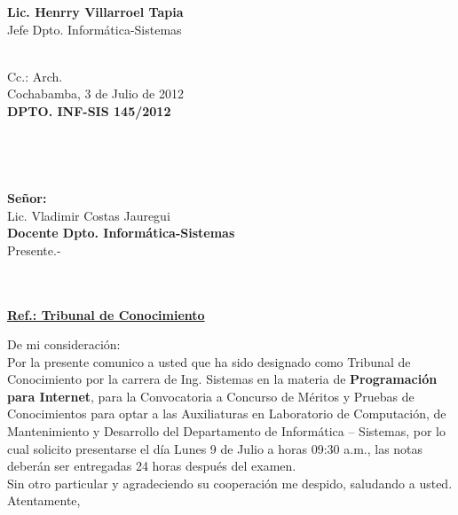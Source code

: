 \documentclass[letterpaper,11pt]{letter}
\begin{document}
\vspace{3.5cm}
\begin{center}
\begin{minipage}[b]{0.5\textwidth}
\begin{center}
{\bf Lic. Henrry Villarroel Tapia}\\
Jefe Dpto. Informática-Sistemas\\
\end{center}
\end{minipage}
\end{center}
~\\
Cc.: Arch.\\
\newpage
Cochabamba, 3 de Julio de 2012~\\
 \textbf{DPTO. INF-SIS 145/2012}\\
~\\
~\\
~\\
~\\
 \textbf{Señor:}~\\
Lic. Vladimir Costas Jauregui~\\
 \textbf{Docente Dpto. Informática-Sistemas}~\\
Presente.-\\
~\\
~\\
\begin{center}
\underline{ \textbf{Ref.: Tribunal de Conocimiento}}
\end{center}
De mi consideración:\\
Por la presente comunico a usted que ha sido designado como Tribunal de Conocimiento por la carrera de Ing. Sistemas en la materia de \textbf{Programación para Internet}, para la Convocatoria a Concurso de Méritos y Pruebas de Conocimientos para optar a las Auxiliaturas en Laboratorio de Computación, de Mantenimiento y Desarrollo del Departamento de Informática – Sistemas, por lo cual solicito presentarse el día Lunes 9 de Julio a horas 09:30 a.m., las notas deberán ser entregadas 24 horas después del examen.\\
Sin otro particular y agradeciendo su cooperación me despido, saludando a usted.\\
Atentamente,\\
\end{document}
